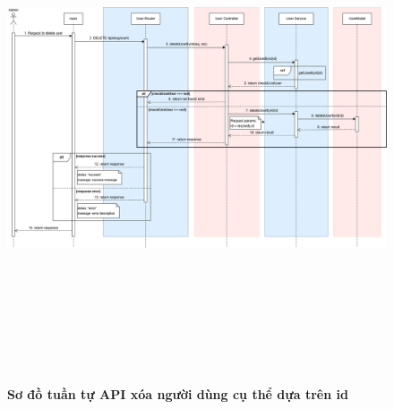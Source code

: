 \begin{figure}[H]
	\centering
	\includegraphics[width=15cm,height=15cm]{Images/api_sequence/user/deleteUserById.drawio.png}
	\caption[Sơ đồ tuần tự API xóa người dùng cụ thể dựa trên id]{\bfseries \fontsize{12pt}{0pt}\selectfont Sơ đồ tuần tự API xóa người dùng cụ thể dựa trên id}
	\label{sequence_diagram_delete_user}
\end{figure}

